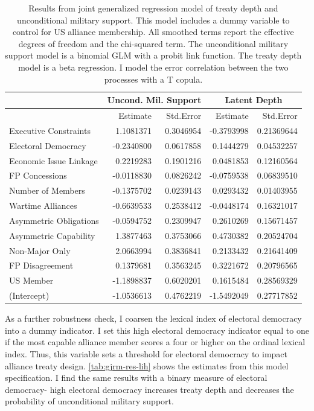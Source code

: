 \documentclass[12pt]{article}
\begin{document}
\begin{table}[ht]
\centering
\begin{tabular}{lrrrr}
  & \multicolumn{2}{c}{Uncond. Mil. Support} & \multicolumn{2}{c}{Latent Depth}\\ \hline
 & Estimate & Std.Error & Estimate & Std.Error \\ 
  \hline 
  Executive Constraints & 1.1081371 & 0.3046954 & -0.3793998 & 0.21369644 \\ 
  Electoral Democracy & -0.2340800 & 0.0617858 & 0.1444279 & 0.04532257 \\ 
  Economic Issue Linkage & 0.2219283 & 0.1901216 & 0.0481853 & 0.12160564 \\ 
  FP Concessions & -0.0118830 & 0.0826242 & -0.0759538 & 0.06839510 \\ 
  Number of Members & -0.1375702 & 0.0239143 & 0.0293432 & 0.01403955 \\ 
  Wartime Alliances & -0.6639533 & 0.2538412 & -0.0448174 & 0.16321017 \\ 
  Asymmetric Obligations & -0.0594752 & 0.2309947 & 0.2610269 & 0.15671457 \\ 
  Asymmetric Capability & 1.3877463 & 0.3753066 & 0.4730382 & 0.20524704 \\ 
  Non-Major Only & 2.0663994 & 0.3836841 & 0.2133432 & 0.21641409 \\ 
  FP Disagreement & 0.1379681 & 0.3563245 & 0.3221672 & 0.20796565 \\ 
  US Member & -1.1898837 & 0.6020201 & 0.1615484 & 0.28569329 \\ 
  (Intercept) & -1.0536613 & 0.4762219 & -1.5492049 & 0.27717852 \\
   \hline
\end{tabular}
\caption{Results from joint generalized regression model of treaty depth and unconditional military support. 
                     This model includes a dummy variable to control for US alliance membership.
                     All smoothed terms report the effective degrees of freedom and the chi-squared term. 
                     The unconditional military support model is a binomial GLM with a probit link function. 
                     The treaty depth model is a beta regression. 
                     I model the error correlation between the two processes with a T copula.} 
\label{tab:gjrm-res-us}
\end{table}


As a further robustness check, I coarsen the lexical index of electoral democracy into a dummy indicator. 
I set this high electoral democracy indicator equal to one if the most capable alliance member scores a four or higher on the ordinal lexical index. 
Thus, this variable sets a threshold for electoral democracy to impact alliance treaty design. 
\autoref{tab:gjrm-res-lih} shows the estimates from this model specification. 
I find the same results with a binary measure of electoral democracy- high electoral democracy increases treaty depth and decreases the probability of unconditional military support. 
\end{document}

